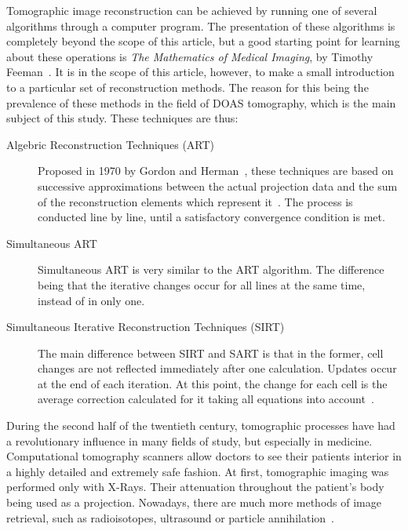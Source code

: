 Tomographic image reconstruction can be achieved by running one of
several algorithms through a computer program. The presentation of these
algorithms is completely beyond the scope of this article, but a good
starting point for learning about these operations is \emph{The
Mathematics of Medical Imaging}, by Timothy Feeman~\cite{Feeman2010}. It
is in the scope of this article, however, to make a small introduction
to a particular set of reconstruction methods. The reason for this being
the prevalence of these methods in the field of DOAS tomography, which
is the main subject of this study. These techniques are thus:
\begin{description}
    \item[Algebric Reconstruction Techniques (ART)] Proposed in 1970 by
        Gordon and Herman~\cite{Herman1973}, these techniques are based
        on successive approximations between the actual projection data
        and the sum of the reconstruction elements which represent
        it~\cite{Gordon1974}. The process is conducted line by line,
        until a satisfactory convergence condition is met.

    \item[Simultaneous ART] Simultaneous ART is very similar to the ART
        algorithm. The difference being that the iterative changes occur
        for all lines at the same time, instead of in only one.

    \item[Simultaneous Iterative Reconstruction Techniques (SIRT)] The
        main difference between SIRT and SART is that in the former,
        cell changes are not reflected immediately after one
        calculation. Updates occur at the end of each iteration. At this
        point, the change for each cell is the average correction
        calculated for it taking all equations into
        account~\cite{Kak2001}.
\end{description}

During the second half of the twentieth century, tomographic processes
have had a revolutionary influence in many fields of study, but
especially in medicine. Computational tomography scanners allow doctors
to see their patients interior in a highly detailed and extremely safe
fashion. At first, tomographic imaging was performed only with X-Rays.
Their attenuation throughout the patient's body being used as a
projection. Nowadays, there are much more methods of image retrieval,
such as radioisotopes, ultrasound or particle
annihilation~\cite{Kak2001a, Feeman2010, Herman2009}.

